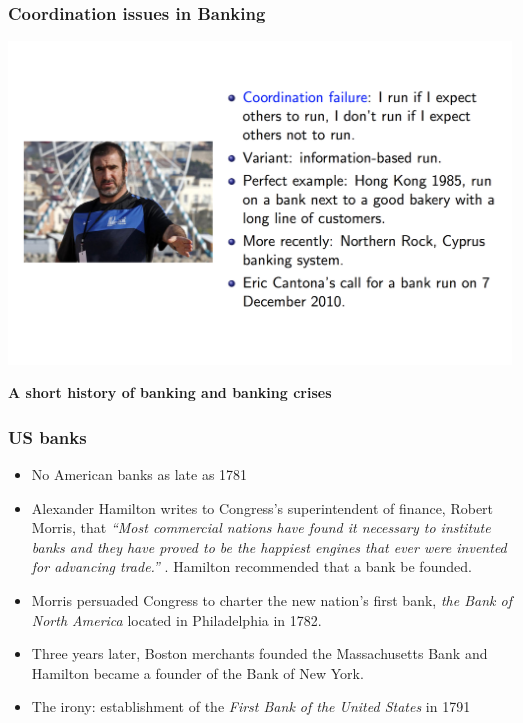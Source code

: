 \documentclass[11pt]{beamer}
\begin{document}
\begin{frame}
  \frametitle{Coordination issues in Banking}
  \begin{center}
    \includegraphics[width=\textwidth]{Figures/bank_runs3.png}
  \end{center}
\end{frame}




\begin{frame}
  \begin{center}
    {\Large \textbf{A short history of banking and banking crises}}
  \end{center}
\end{frame}

\begin{frame}
\frametitle{US banks}
\begin{itemize}
\item No American banks as late as 1781
\item Alexander Hamilton writes to Congress’s superintendent of finance, Robert Morris, that \textit { “Most commercial nations have found it necessary to institute banks and they have proved to be the happiest engines that ever were invented for advancing trade.” }. Hamilton recommended that a bank be founded.
\item Morris persuaded Congress to charter the new nation’s first bank, \textit{the Bank of North America} located in Philadelphia in 1782.
\item Three years later, Boston merchants founded the Massachusetts Bank and Hamilton became a founder of the Bank of New York.
\item The irony: establishment of the \textit{First Bank of the United States} in 1791

\end{itemize}

\end{frame}
\end{document}
